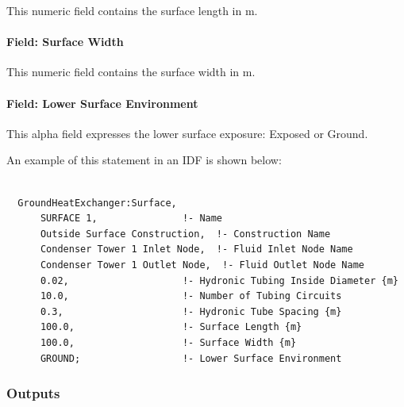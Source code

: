This numeric field contains the surface length in m.

\paragraph{Field: Surface Width}\label{field-surface-width}

This numeric field contains the surface width in m.

\paragraph{Field: Lower Surface Environment}\label{field-lower-surface-environment}

This alpha field expresses the lower surface exposure: Exposed or Ground.

An example of this statement in an IDF is shown below:

\begin{lstlisting}

  GroundHeatExchanger:Surface,
      SURFACE 1,               !- Name
      Outside Surface Construction,  !- Construction Name
      Condenser Tower 1 Inlet Node,  !- Fluid Inlet Node Name
      Condenser Tower 1 Outlet Node,  !- Fluid Outlet Node Name
      0.02,                    !- Hydronic Tubing Inside Diameter {m}
      10.0,                    !- Number of Tubing Circuits
      0.3,                     !- Hydronic Tube Spacing {m}
      100.0,                   !- Surface Length {m}
      100.0,                   !- Surface Width {m}
      GROUND;                  !- Lower Surface Environment
\end{lstlisting}

\subsubsection{Outputs}\label{outputs-13-000}

